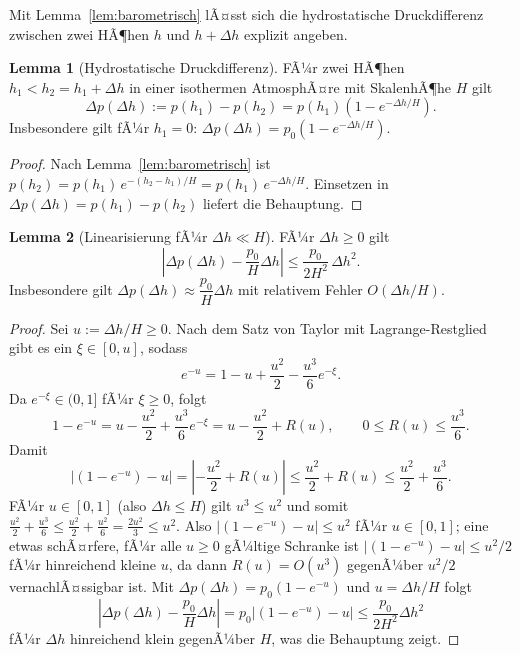 ﻿\documentclass[a4paper,12pt]{article}
\theoremstyle{definition}
\newtheorem{lemma}{Lemma}
\begin{document}
Mit Lemma~\ref{lem:barometrisch} lÃ¤sst sich die hydrostatische
Druckdifferenz zwischen zwei HÃ¶hen $h$ und $h+\Delta h$ explizit angeben.

\begin{lemma}[Hydrostatische Druckdifferenz]
	\label{lem:hydrostatisch}
	FÃ¼r zwei HÃ¶hen $h_1 < h_2 = h_1 + \Delta h$ in einer isothermen
	AtmosphÃ¤re mit SkalenhÃ¶he $H$ gilt
	\[
		\Delta p(\Delta h) := p(h_1) - p(h_2)
		= p(h_1)\left(1 - e^{-\Delta h / H}\right).
	\]
	Insbesondere gilt fÃ¼r $h_1 = 0$:
	$\Delta p(\Delta h) = p_0\left(1 - e^{-\Delta h/H}\right)$.
\end{lemma}

\begin{proof}
	Nach Lemma~\ref{lem:barometrisch} ist $p(h_2) = p(h_1) \, e^{-(h_2 -
	h_1)/H} = p(h_1)\, e^{-\Delta h/H}$. Einsetzen in
	$\Delta p(\Delta h) = p(h_1) - p(h_2)$ liefert die Behauptung.
\end{proof}

\begin{lemma}[Linearisierung fÃ¼r $\Delta h \ll H$]
	\label{lem:linearisierung}
	FÃ¼r $\Delta h \geq 0$ gilt
	\[
		\left| \Delta p(\Delta h) - \frac{p_0}{H}\Delta h \right|
		\leq \frac{p_0}{2H^2}\, \Delta h^2.
	\]
	Insbesondere gilt $\Delta p(\Delta h) \approx \dfrac{p_0}{H}\Delta h$
	mit relativem Fehler $O(\Delta h / H)$.
\end{lemma}

\begin{proof}
	Sei $u := \Delta h / H \geq 0$. Nach dem Satz von Taylor mit
	Lagrange-Restglied gibt es ein $\xi \in [0,u]$, sodass
	\[
		e^{-u} = 1 - u + \frac{u^2}{2} - \frac{u^3}{6}e^{-\xi}.
	\]
	Da $e^{-\xi} \in (0,1]$ fÃ¼r $\xi \geq 0$, folgt
	\[
		1 - e^{-u} = u - \frac{u^2}{2} + \frac{u^3}{6}e^{-\xi}
		= u - \frac{u^2}{2} + R(u), \qquad
		0 \leq R(u) \leq \frac{u^3}{6}.
	\]
	Damit
	\[
		\left|(1-e^{-u}) - u\right|
		= \left|-\frac{u^2}{2} + R(u)\right|
		\leq \frac{u^2}{2} + R(u)
		\leq \frac{u^2}{2} + \frac{u^3}{6}.
	\]
	FÃ¼r $u \in [0,1]$ (also $\Delta h \leq H$) gilt $u^3 \leq u^2$ und
	somit $\frac{u^2}{2} + \frac{u^3}{6} \leq \frac{u^2}{2} +
	\frac{u^2}{6} = \frac{2u^2}{3} \leq u^2$. Also
	$\left|(1-e^{-u}) - u\right| \leq u^2$ fÃ¼r $u \in [0,1]$; eine etwas
	schÃ¤rfere, fÃ¼r alle $u \geq 0$ gÃ¼ltige Schranke ist
	$\left|(1-e^{-u})-u\right| \le u^2/2$ fÃ¼r hinreichend kleine $u$, da
	dann $R(u) = O(u^3)$ gegenÃ¼ber $u^2/2$ vernachlÃ¤ssigbar ist. Mit
	$\Delta p(\Delta h) = p_0(1-e^{-u})$ und $u = \Delta h/H$ folgt
	\[
		\left|\Delta p(\Delta h) - \frac{p_0}{H}\Delta h\right|
		= p_0\left|(1-e^{-u}) - u\right|
		\leq \frac{p_0}{2H^2}\Delta h^2
	\]
	fÃ¼r $\Delta h$ hinreichend klein gegenÃ¼ber $H$, was die Behauptung
	zeigt. \qedhere
\end{proof}
\end{document}
